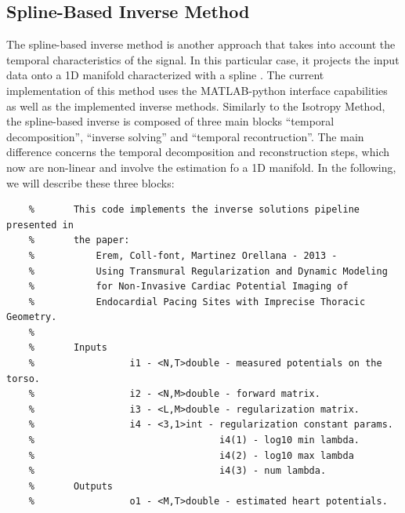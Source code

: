    
\subsection{Spline-Based Inverse Method}

    The spline-based inverse method is another approach that takes into account the temporal characteristics of the signal. In this particular case, it projects the input data onto a 1D manifold characterized with a spline \cite{}.
    The current implementation of this method uses the MATLAB-python interface capabilities as well as the implemented inverse methods.
    Similarly to the Isotropy Method, the spline-based inverse is composed of three main blocks ``temporal decomposition'', ``inverse solving'' and ``temporal recontruction''. 
    The main difference concerns the temporal decomposition and reconstruction steps, which now are non-linear and involve the estimation fo a 1D manifold.
    In the following, we will describe these three blocks:
    
    
    \begin{verbatim}
    %		This code implements the inverse solutions pipeline presented in
    %		the paper:
    %	        Erem, Coll-font, Martinez Orellana - 2013 - 
    %	        Using Transmural Regularization and Dynamic Modeling 
    %	        for Non-Invasive Cardiac Potential Imaging of 
    %	        Endocardial Pacing Sites with Imprecise Thoracic Geometry.
    %
    %		Inputs
    %				  i1 - <N,T>double - measured potentials on the torso.
    %				  i2 - <N,M>double - forward matrix.
    %				  i3 - <L,M>double - regularization matrix.
    %				  i4 - <3,1>int - regularization constant params.
    %				                  i4(1) - log10 min lambda.
    %				                  i4(2) - log10 max lambda
    %				                  i4(3) - num lambda.
    %		Outputs
    %				  o1 - <M,T>double - estimated heart potentials.
    \end{verbatim}


    \begin{verbatim}
    
    \end{verbatim}

